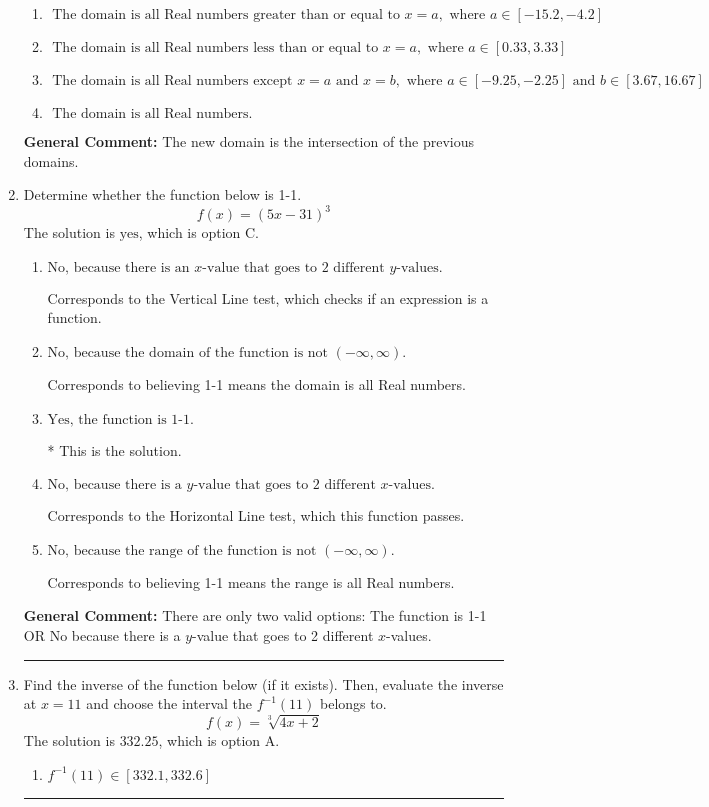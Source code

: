 \documentclass{extbook}[14pt]
\newcommand{\litem}[1]{\item #1

\rule{\textwidth}{0.4pt}}
\begin{document}
\begin{enumerate}
{\begin{enumerate}[label=\Alph*.]
\item \( \text{ The domain is all Real numbers greater than or equal to } x = a, \text{ where } a \in [-15.2, -4.2] \)


\item \( \text{ The domain is all Real numbers less than or equal to } x = a, \text{ where } a \in [0.33, 3.33] \)


\item \( \text{ The domain is all Real numbers except } x = a \text{ and } x = b, \text{ where } a \in [-9.25, -2.25] \text{ and } b \in [3.67, 16.67] \)


\item \( \text{ The domain is all Real numbers. } \)


\end{enumerate}

\textbf{General Comment:} The new domain is the intersection of the previous domains.
}
\litem{
Determine whether the function below is 1-1.
\[ f(x) = (5 x - 31)^3 \]The solution is \( \text{yes} \), which is option C.\begin{enumerate}[label=\Alph*.]
\item \( \text{No, because there is an $x$-value that goes to 2 different $y$-values.} \)

Corresponds to the Vertical Line test, which checks if an expression is a function.
\item \( \text{No, because the domain of the function is not $(-\infty, \infty)$.} \)

Corresponds to believing 1-1 means the domain is all Real numbers.
\item \( \text{Yes, the function is 1-1.} \)

* This is the solution.
\item \( \text{No, because there is a $y$-value that goes to 2 different $x$-values.} \)

Corresponds to the Horizontal Line test, which this function passes.
\item \( \text{No, because the range of the function is not $(-\infty, \infty)$.} \)

Corresponds to believing 1-1 means the range is all Real numbers.
\end{enumerate}

\textbf{General Comment:} There are only two valid options: The function is 1-1 OR No because there is a $y$-value that goes to 2 different $x$-values.
}
\litem{
Find the inverse of the function below (if it exists). Then, evaluate the inverse at $x = 11$ and choose the interval the $f^{-1}(11)$ belongs to.
\[ f(x) = \sqrt[3]{4 x + 2} \]The solution is \( 332.25 \), which is option A.\begin{enumerate}[label=\Alph*.]
\item \( f^{-1}(11) \in [332.1, 332.6] \)


\end{enumerate}}
\end{enumerate}
\end{document}
